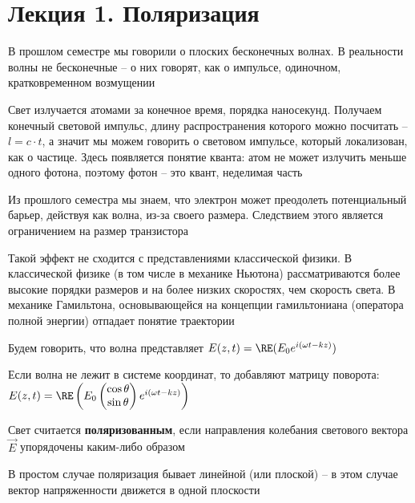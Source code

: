 \documentclass[12pt]{article}
\begin{document}
    \tableofcontents
    \clearpage






\section{Лекция 1. Поляризация}

В прошлом семестре мы говорили о плоских бесконечных волнах. В реальности волны не бесконечные -- о них говорят, как о импульсе, одиночном, кратковременном возмущении

Свет излучается атомами за конечное время, порядка наносекунд. Получаем конечный световой импульс, длину распространения которого можно посчитать -- $l = c \cdot t$, а значит мы можем говорить о световом импульсе, который локализован, как о частице. Здесь появляется понятие кванта: атом не может излучить меньше одного фотона, поэтому фотон -- это квант, неделимая часть

Из прошлого семестра мы знаем, что электрон может преодолеть потенциальный барьер, действуя как волна, из-за своего размера. Следствием этого является ограничением на размер транзистора

Такой эффект не сходится с представлениями классической физики. В классической физике (в том числе в механике Ньютона) рассматриваются более высокие порядки размеров и на более низких скоростях, чем скорость света.
В механике Гамильтона, основывающейся на концепции гамильтониана (оператора полной энергии) отпадает понятие траектории

\mediumvspace

Будем говорить, что волна представляет $E(z, t) = \RE(E_0 e^{i(\omega t - kz)})$

Если волна не лежит в системе координат, то добавляют матрицу поворота: $E(z, t) = \RE\left(E_0 \begin{pmatrix}\cos \theta \\ \sin \theta \end{pmatrix} e^{i(\omega t - kz)}\right)$

\smallvspace

Свет считается \textbf{поляризованным}, если направления колебания светового вектора $\vec E$ упорядочены каким-либо образом


В простом случае поляризация бывает линейной (или плоской) -- в этом случае вектор напряженности движется в одной плоскости
\end{document}

